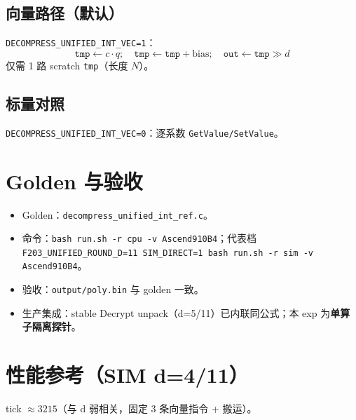 \documentclass[UTF8,a4paper,11pt]{ctexart}
\begin{document}
\subsection{向量路径（默认）}
\texttt{DECOMPRESS\_UNIFIED\_INT\_VEC=1}：
\[
  \texttt{tmp} \leftarrow c\cdot q;\quad \texttt{tmp} \leftarrow \texttt{tmp}+\text{bias};\quad \texttt{out} \leftarrow \texttt{tmp}\gg d
\]
仅需 1 路 scratch \texttt{tmp}（长度 $N$）。

\subsection{标量对照}
\texttt{DECOMPRESS\_UNIFIED\_INT\_VEC=0}：逐系数 \texttt{GetValue/SetValue}。

\section{Golden 与验收}

\begin{itemize}
  \item Golden：\texttt{decompress\_unified\_int\_ref.c}。
  \item 命令：\texttt{bash run.sh -r cpu -v Ascend910B4}；代表档 \texttt{F203\_UNIFIED\_ROUND\_D=11 SIM\_DIRECT=1 bash run.sh -r sim -v Ascend910B4}。
  \item 验收：\texttt{output/poly.bin} 与 golden 一致。
  \item 生产集成：stable Decrypt unpack（d=5/11）已内联同公式；本 exp 为\textbf{单算子隔离探针}。
\end{itemize}

\section{性能参考（SIM d=4/11）}

tick $\approx 3215$（与 d 弱相关，固定 3 条向量指令 + 搬运）。
\end{document}
